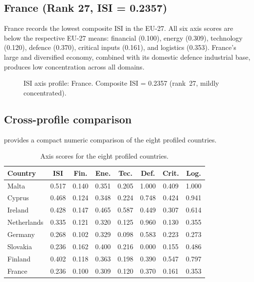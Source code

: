 \subsection{France (Rank 27, ISI = 0.2357)}

France records the lowest composite ISI in the EU-27.  All six
axis scores are below the respective EU-27 means: financial
(0.100), energy (0.309), technology (0.120), defence (0.370),
critical inputs (0.161), and logistics (0.353).  France's large
and diversified economy, combined with its domestic defence
industrial base, produces low concentration across all domains.

\begin{figure}[htbp]
\centering

\caption{ISI axis profile: France.  Composite ISI = 0.2357
  (rank~27, mildly concentrated).}
\label{fig:radar-FR}
\end{figure}

\subsection{Cross-profile comparison}

 provides a compact numeric comparison
of the eight profiled countries.

\begin{table}[htbp]
\centering
\caption{Axis scores for the eight profiled countries.}
\label{tab:profile-comparison}
\footnotesize
\setlength{\tabcolsep}{3pt}
\begin{tabular}{@{}l
  S[table-format=1.3]
  S[table-format=1.3]
  S[table-format=1.3]
  S[table-format=1.3]
  S[table-format=1.3]
  S[table-format=1.3]
  S[table-format=1.3]@{}}
\toprule
\textbf{Country} & {\textbf{ISI}} & {\textbf{Fin.}} & {\textbf{Ene.}}
  & {\textbf{Tec.}} & {\textbf{Def.}} & {\textbf{Crit.}}
  & {\textbf{Log.}} \\
\midrule
Malta        & 0.517 & 0.140 & 0.351 & 0.205 & 1.000 & 0.409 & 1.000 \\
Cyprus       & 0.468 & 0.124 & 0.348 & 0.224 & 0.748 & 0.424 & 0.941 \\
Ireland      & 0.428 & 0.147 & 0.465 & 0.587 & 0.449 & 0.307 & 0.614 \\
Netherlands  & 0.335 & 0.121 & 0.320 & 0.125 & 0.960 & 0.130 & 0.355 \\
Germany      & 0.268 & 0.102 & 0.329 & 0.098 & 0.583 & 0.223 & 0.273 \\
Slovakia     & 0.236 & 0.162 & 0.400 & 0.216 & 0.000 & 0.155 & 0.486 \\
Finland      & 0.402 & 0.118 & 0.363 & 0.198 & 0.390 & 0.547 & 0.797 \\
France       & 0.236 & 0.100 & 0.309 & 0.120 & 0.370 & 0.161 & 0.353 \\
\bottomrule
\end{tabular}
\end{table}

